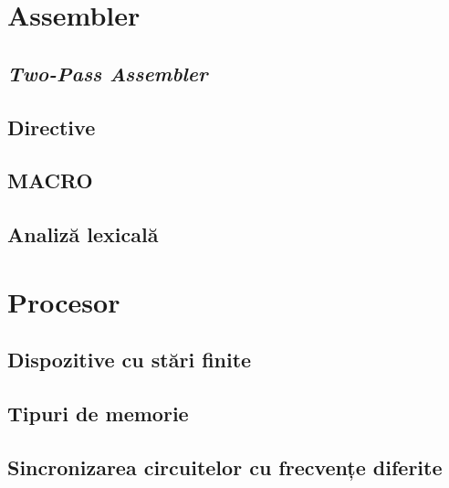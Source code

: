 \documentclass[../main.tex]{subfiles}
\begin{document}
\section{Assembler}
\subsection{\emph{Two-Pass Assembler}}
\cite{asl}
\subsection{Directive}
\cite{asl}
\subsection{MACRO}
\cite{asl}
\subsection{Analiză lexicală}
\cite{lexer}

\section{Procesor}
\subsection{Dispozitive cu stări finite}
\cite{fsm}
\subsection{Tipuri de memorie}
\cite{cache}
\cite{block_memory}
\subsection{Sincronizarea circuitelor cu frecvențe diferite}
\cite{sync}
\end{document}
